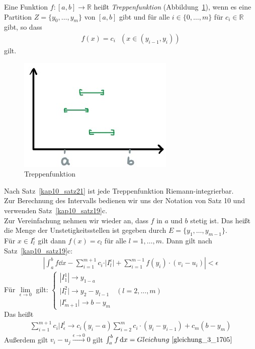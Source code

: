 \begin{Definition}{
	Eine Funktion $f: [a,b] \rightarrow \mathbb{R}$ heißt \emph{Treppenfunktion}
	 (Abbildung~\ref{plot_treppenfkt}), 
	wenn es 
	eine Partition $Z = \{ y_0, \hdots, y_m \}$ von $[a,b]$ gibt und für alle 
	$i \in \{0, \hdots, m\}$ für $c_i \in \mathbb{R}$ gibt, so dass 
	\begin{align*}
		f(x) = c_i \text{ } ( x\in (y_{i-1},y_i))
	\end{align*}
	gilt.
	\begin{figure}
		\begin{center}
			\includegraphics[scale=0.5]{Skizzen/plot_treppenfkt}
		\end{center}
		\caption{Treppenfunktion}
		\label{plot_treppenfkt}
	\end{figure}
	Nach Satz~\ref{kap10_satz21}
	ist jede Treppenfunktion Riemann-integrierbar. \\
	Zur Berechnung des Intervalls bedienen wir uns der Notation von Satz 10 
	und verwenden Satz~\ref{kap10_satz19}c.\\
	Zur Vereinfachung nehmen wir wieder an, dass $f$ in $a$ und $b$ stetig ist. 
	Das heißt die Menge der Unstetigkeitsstellen ist gegeben durch 
	$E = \{y_1, \hdots, y_{m-1}\}$. \\
	Für $x \in I_l^{\epsilon}$ gilt dann $f(x) = c_l$ für alle $ l = 1, \hdots, m$.
	Dann gilt nach Satz~\ref{kap10_satz19}c:
	\begin{align*}
		\left\vert \int_a^b f \dd{x} - \sum_{i=1}^{m+1} c_i \cdot \vert 
		I_l^{\epsilon}\vert + \sum_{i =1}^{m-1} f(y_i)\cdot (v_i -u_i) \right\vert
		< \epsilon
	\end{align*}
	Für $ \lim\limits_{\epsilon \rightarrow 0}{}$ gilt:
	$\begin{cases} 
		|I_1^1| \rightarrow y_{1-a} & \\
		\vert I_l^2 \vert \rightarrow y_2 - y_{l-1} & ( l = 2,...,m) \\
		\vert I_{m+1}^{\epsilon} \vert \rightarrow b - y_m &
	\end{cases}$ \\
	Das heißt
	\begin{align}
		\label{gleichung_3_1705}
		\sum_{i=1}^{m+1}c_i\vert I_{\epsilon}^l \rightarrow c_i(y_i -a) 
		\sum_{i=2}^m c_i \cdot (y_i -y_{i-1}) + c_m(b-y_m)
	\end{align}
	Außerdem gilt $v_i-u_j \overset{\epsilon \rightarrow 0}{\rightarrow} 0$
	gilt $\int_a^b f\dd{x} = Gleichung~\ref{gleichung_3_1705}$
	
}\end{Definition}
